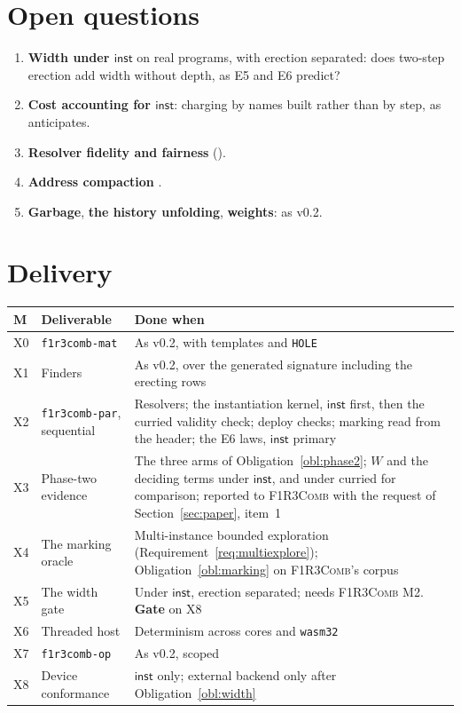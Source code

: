 \documentclass[11pt,a4paper]{article}
\newcommand{\code}[1]{\texttt{#1}}
\newcommand{\Comb}{\textsc{F1R3Comb}}
\theoremstyle{definition}
\theoremstyle{plain}
\newcommand{\inst}{\mathsf{inst}}
\begin{document}
\section{Open questions}

\begin{enumerate}[leftmargin=1.8em]
\item \textbf{Width under $\inst$} on real programs, with erection separated:
does two-step erection add width without depth, as E5 and E6 predict?
\item \textbf{Cost accounting for $\inst$}: charging by names built rather
than by step, as \cite[Rem.~5.22]{combspec} anticipates.
\item \textbf{Resolver fidelity and fairness} (\cite[Obl.~13.1,
Obl.~13.6]{matnote}).
\item \textbf{Address compaction} \cite[\S15, item~1]{combspec}.
\item \textbf{Garbage}, \textbf{the history unfolding}, \textbf{weights}: as
v0.2.
\end{enumerate}

\section{Delivery}

\begin{center}
\begin{tabularx}{\linewidth}{@{}ll>{\raggedright\arraybackslash}X@{}}
\toprule
M & Deliverable & Done when\\
\midrule
X0 & \code{f1r3comb-mat} & As v0.2, with templates and \code{HOLE}\\
X1 & Finders & As v0.2, over the generated signature including the erecting
rows\\
X2 & \code{f1r3comb-par}, sequential & Resolvers; the instantiation kernel,
$\inst$ first, then the curried validity check; deploy checks; marking read
from the header; the E6 laws, $\inst$ primary\\
X3 & Phase-two evidence & The three arms of Obligation~\ref{obl:phase2}; $W$
and the deciding terms under $\inst$, and under curried for comparison;
reported to \Comb{} with the request of Section~\ref{sec:paper}, item~1\\
X4 & The marking oracle & Multi-instance bounded exploration
(Requirement~\ref{req:multiexplore}); Obligation~\ref{obl:marking} on
\Comb's corpus\\
X5 & The width gate & Under $\inst$, erection separated; needs \Comb{} M2.
\textbf{Gate} on X8\\
X6 & Threaded host & Determinism across cores and \code{wasm32}\\
X7 & \code{f1r3comb-op} & As v0.2, scoped\\
X8 & Device conformance & $\inst$ only; external backend only after
Obligation~\ref{obl:width}\\
\bottomrule
\end{tabularx}
\end{center}
\end{document}
